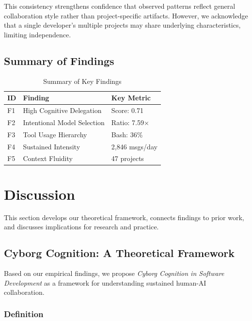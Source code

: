 \documentclass{ntlabs-preprint}
\begin{document}
This consistency strengthens confidence that observed patterns reflect general collaboration style rather than project-specific artifacts. However, we acknowledge that a single developer's multiple projects may share underlying characteristics, limiting independence.

\subsection{Summary of Findings}

\begin{table}[h]
\centering
\caption{Summary of Key Findings}
\label{tab:summary}
\begin{tabular}{lll}
\toprule
\textbf{ID} & \textbf{Finding} & \textbf{Key Metric} \\
\midrule
F1 & High Cognitive Delegation & Score: 0.71 \\
F2 & Intentional Model Selection & Ratio: 7.59$\times$ \\
F3 & Tool Usage Hierarchy & Bash: 36\% \\
F4 & Sustained Intensity & 2,846 msgs/day \\
F5 & Context Fluidity & 47 projects \\
\bottomrule
\end{tabular}
\end{table}

\section{Discussion}

This section develops our theoretical framework, connects findings to prior work, and discusses implications for research and practice.

\subsection{Cyborg Cognition: A Theoretical Framework}

Based on our empirical findings, we propose \textit{Cyborg Cognition in Software Development} as a framework for understanding sustained human-AI collaboration.

\subsubsection{Definition}
\end{document}

